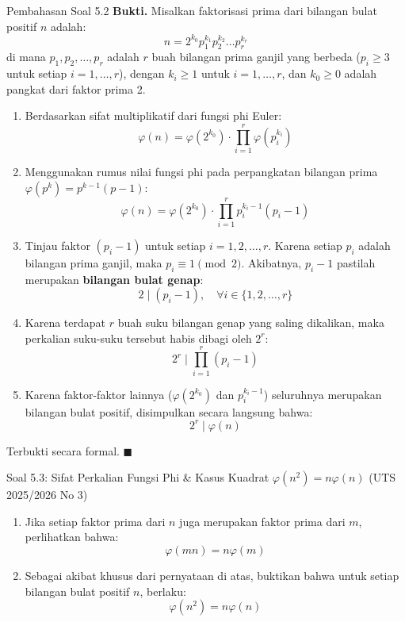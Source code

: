 \documentclass[11pt,a4paper]{article}
\newenvironment{proof}{\noindent\textbf{Bukti.}}{\hfill$\blacksquare$\vspace{0.3em}}
\begin{document}
\begin{solusibox}{Pembahasan Soal 5.2}
\begin{proof}
Misalkan faktorisasi prima dari bilangan bulat positif $n$ adalah:
\[
n = 2^{k_0} p_1^{k_1} p_2^{k_2} \dots p_r^{k_r}
\]
di mana $p_1, p_2, \dots, p_r$ adalah $r$ buah bilangan prima ganjil yang berbeda ($p_i \ge 3$ untuk setiap $i = 1, \dots, r$), dengan $k_i \ge 1$ untuk $i = 1, \dots, r$, dan $k_0 \ge 0$ adalah pangkat dari faktor prima 2.
\begin{enumerate}[leftmargin=*]
    \item Berdasarkan sifat multiplikatif dari fungsi phi Euler:
    \[
    \varphi(n) = \varphi(2^{k_0}) \cdot \prod_{i=1}^r \varphi(p_i^{k_i})
    \]
    \item Menggunakan rumus nilai fungsi phi pada perpangkatan bilangan prima $\varphi(p^k) = p^{k-1}(p - 1)$:
    \[
    \varphi(n) = \varphi(2^{k_0}) \cdot \prod_{i=1}^r p_i^{k_i - 1} (p_i - 1)
    \]
    \item Tinjau faktor $(p_i - 1)$ untuk setiap $i = 1, 2, \dots, r$.
    Karena setiap $p_i$ adalah bilangan prima ganjil, maka $p_i \equiv 1 \pmod 2$.
    Akibatnya, $p_i - 1$ pastilah merupakan \textbf{bilangan bulat genap}:
    \[
    2 \mid (p_i - 1), \quad \forall i \in \{1, 2, \dots, r\}
    \]
    \item Karena terdapat $r$ buah suku bilangan genap yang saling dikalikan, maka perkalian suku-suku tersebut habis dibagi oleh $2^r$:
    \[
    2^r \;\Big|\; \prod_{i=1}^r (p_i - 1)
    \]
    \item Karena faktor-faktor lainnya ($\varphi(2^{k_0})$ dan $p_i^{k_i - 1}$) seluruhnya merupakan bilangan bulat positif, disimpulkan secara langsung bahwa:
    \[
    2^r \mid \varphi(n)
    \]
\end{enumerate}
Terbukti secara formal.
\end{proof}
\end{solusibox}

\vspace{0.4cm}

\begin{soalbox}{Soal 5.3: Sifat Perkalian Fungsi Phi \& Kasus Kuadrat $\varphi(n^2) = n\varphi(n)$ (UTS 2025/2026 No 3)}
\begin{enumerate}[label=(\alph*)]
    \item Jika setiap faktor prima dari $n$ juga merupakan faktor prima dari $m$, perlihatkan bahwa:
    \[
    \varphi(mn) = n \varphi(m)
    \]
    \item Sebagai akibat khusus dari pernyataan di atas, buktikan bahwa untuk setiap bilangan bulat positif $n$, berlaku:
    \[
    \varphi(n^2) = n \varphi(n)
    \]
\end{enumerate}
\end{soalbox}
\end{document}
